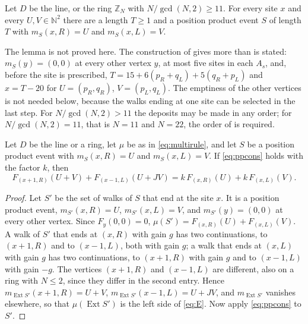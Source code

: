 \begin{lemma}\label{lem:prep}
Let $D$ be the line, or the ring $\mathbb{Z}_N$ with $N/\gcd(N,2)\ge11$. For every site $x$ and every $U,V\in\mathbb{N}^2$ there are a length $T\ge1$ and a position product event $S$ of length $T$ with $m_S(x,R)=U$ and $m_S(x,L)=V$.
\end{lemma}

The lemma is not proved here. The construction of \cite{dgmask} gives more than is stated: $m_S(y)=(0,0)$ at every other vertex $y$, at most five sites in each $A_s$, and, before the site is prescribed, $T=15+6(p_R+q_L)+5(q_R+p_L)$ and $x=T-20$ for $U=(p_R,q_R)$, $V=(p_L,q_L)$. The emptiness of the other vertices is not needed below, because the walks ending at one site can be selected in the last step. For $N/\gcd(N,2)>11$ the deposits may be made in any order; for $N/\gcd(N,2)=11$, that is $N=11$ and $N=22$, the order of \cite{dgmask} is required.

\begin{lemma}\label{lem:onesite}
Let $D$ be the line or a ring, let $\mu$ be as in \eqref{eq:multirule}, and let $S$ be a position product event with $m_S(x,R)=U$ and $m_S(x,L)=V$. If \eqref{eq:ppcons} holds with the factor $k$, then
\begin{equation}\label{eq:E}
F_{(x+1,R)}(U+V)+F_{(x-1,L)}(U+JV)=k\,F_{(x,R)}(U)+k\,F_{(x,L)}(V).
\end{equation}
\end{lemma}
\begin{proof}
Let $S'$ be the set of walks of $S$ that end at the site $x$. It is a position product event, $m_{S'}(x,R)=U$, $m_{S'}(x,L)=V$, and $m_{S'}(y)=(0,0)$ at every other vertex. Since $F_y(0,0)=0$, $\mu(S')=F_{(x,R)}(U)+F_{(x,L)}(V)$. A walk of $S'$ that ends at $(x,R)$ with gain $g$ has two continuations, to $(x+1,R)$ and to $(x-1,L)$, both with gain $g$; a walk that ends at $(x,L)$ with gain $g$ has two continuations, to $(x+1,R)$ with gain $g$ and to $(x-1,L)$ with gain $-g$. The vertices $(x+1,R)$ and $(x-1,L)$ are different, also on a ring with $N\le2$, since they differ in the second entry. Hence $m_{\operatorname{Ext}S'}(x+1,R)=U+V$, $m_{\operatorname{Ext}S'}(x-1,L)=U+JV$, and $m_{\operatorname{Ext}S'}$ vanishes elsewhere, so that $\mu(\operatorname{Ext}S')$ is the left side of \eqref{eq:E}. Now apply \eqref{eq:ppcons} to $S'$.
\end{proof}


